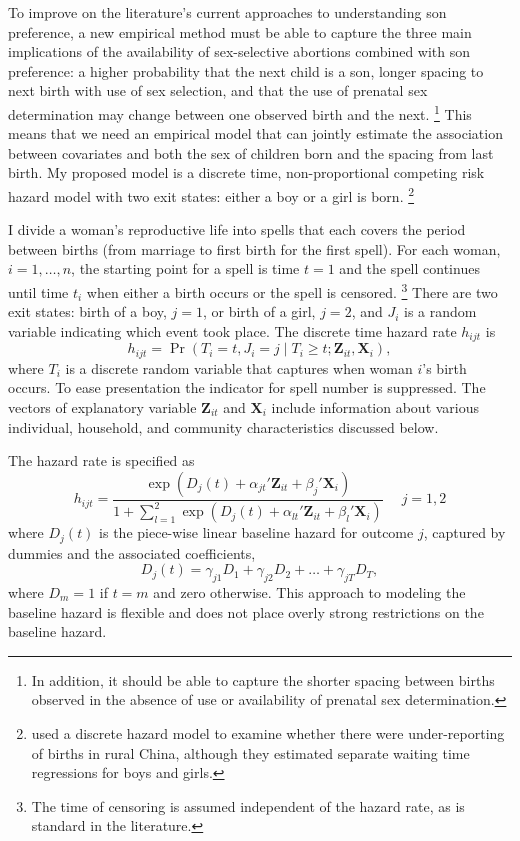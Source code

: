 \documentclass[12pt,letterpaper]{article}
\begin{document}
To improve on the literature's current approaches to understanding 
son preference, a new empirical method must be able to capture the 
three main implications of the availability of sex-selective abortions
combined with son preference:
a higher probability that the next child is a son, 
longer spacing to next birth with use of sex selection, 
and that the use of prenatal sex determination may change between 
one observed birth and the next.%
\footnote{
In addition, it should be able to capture the shorter spacing between
births observed in the absence of use or availability of prenatal 
sex determination.
}
This means that we need an empirical model that can jointly estimate 
the association between covariates and both the sex of children born 
and the spacing from last birth. 
My proposed model is a discrete time, non-proportional competing risk 
hazard model with two exit states: either a boy or a girl is born.%
\footnote{
\cite{Merli2000} used a discrete hazard model to examine whether 
there were under-reporting of births in rural China, although they 
estimated separate waiting time regressions for boys and girls.
}

I divide a woman's reproductive life into spells that each covers 
the period between births (from marriage to first birth for the first spell).
For each woman, $i=1,\ldots,n$, the starting point for a spell is time $t=1$ and 
the spell continues until time $t_i$ when either a birth occurs or the spell 
is censored.%
\footnote{
The time of censoring is assumed independent of the hazard rate,
as is standard in the literature.
}
There are two exit states: birth of a boy, $j=1$, or birth of a girl, $j=2$, and 
$J_i$ is a random variable indicating which event took place.
The discrete time hazard rate $h_{ijt}$ is
\begin{equation}
 h_{ijt} = \Pr (T_i=t, J_i=j \mid T_i \geq t; \mathbf{Z}_{it},\mathbf{X}_{i} ),
\end{equation}
where $T_i$ is a discrete random variable that captures when woman $i$'s birth occurs.
To ease presentation the indicator for spell number is suppressed.
The vectors of explanatory variable $\mathbf{Z}_{it}$ and $\mathbf{X}_{i}$ include 
information about various individual, household, and community characteristics 
discussed below.

The hazard rate is specified as
\begin{equation}
 h_{ijt} = \frac{\exp(D_j(t) + \alpha_{jt}'\mathbf{Z}_{it} + \beta_j'\mathbf{X}_{i})} 
 {1 + \sum_{l=1}^2 \exp(D_j(t) + \alpha_{lt}'\mathbf{Z}_{it} + \beta_l'\mathbf{X}_{i})} \: \: \; \; \;  j = 1,2
 \label{eq:hazard}
\end{equation}
where $D_{j}(t)$ is the piece-wise linear baseline hazard for outcome $j$, captured
by dummies and the associated coefficients,
\begin{equation}
D_j(t) = \gamma_{j1} D_1 + \gamma_{j2} D_2 + \ldots + \gamma_{jT} D_T,
\end{equation}
where $D_m = 1$ if $t=m$ and zero otherwise.
This approach to modeling the baseline hazard is flexible and does not place 
overly strong restrictions on the baseline hazard.
\end{document}
